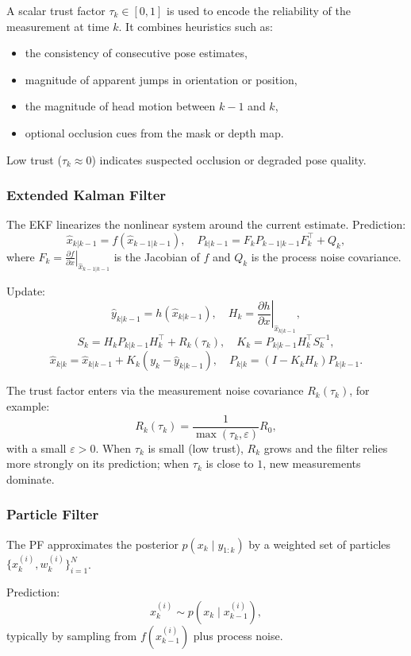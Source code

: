 A scalar trust factor $\tau_k \in [0,1]$ is used to encode the reliability of the measurement at time $k$. It combines heuristics such as:
\begin{itemize}
    \item the consistency of consecutive pose estimates,
    \item magnitude of apparent jumps in orientation or position,
    \item the magnitude of head motion between $k-1$ and $k$,
    \item optional occlusion cues from the mask or depth map.
\end{itemize}
Low trust ($\tau_k \approx 0$) indicates suspected occlusion or degraded pose quality.

\subsubsection*{Extended Kalman Filter}

The EKF linearizes the nonlinear system around the current estimate. Prediction:
\[
\hat{x}_{k|k-1} = f(\hat{x}_{k-1|k-1}), \quad
P_{k|k-1} = F_k P_{k-1|k-1} F_k^\top + Q_k,
\]
where $F_k = \left.\frac{\partial f}{\partial x}\right|_{\hat{x}_{k-1|k-1}}$ is the Jacobian of $f$ and $Q_k$ is the process noise covariance.

Update:
\[
\hat{y}_{k|k-1} = h(\hat{x}_{k|k-1}), \quad
H_k = \left.\frac{\partial h}{\partial x}\right|_{\hat{x}_{k|k-1}},
\]
\[
S_k = H_k P_{k|k-1} H_k^\top + R_k(\tau_k),
\quad
K_k = P_{k|k-1} H_k^\top S_k^{-1},
\]
\[
\hat{x}_{k|k} = \hat{x}_{k|k-1} + K_k (y_k - \hat{y}_{k|k-1}), \quad
P_{k|k} = (I - K_k H_k) P_{k|k-1}.
\]

The trust factor enters via the measurement noise covariance $R_k(\tau_k)$, for example:
\[
R_k(\tau_k) = \frac{1}{\max(\tau_k,\varepsilon)} R_0,
\]
with a small $\varepsilon > 0$. When $\tau_k$ is small (low trust), $R_k$ grows and the filter relies more strongly on its prediction; when $\tau_k$ is close to $1$, new measurements dominate.

\subsubsection*{Particle Filter}

The PF approximates the posterior $p(x_k \mid y_{1:k})$ by a weighted set of particles $\{x_k^{(i)}, w_k^{(i)}\}_{i=1}^N$.

Prediction:
\[
x_k^{(i)} \sim p(x_k \mid x_{k-1}^{(i)}),
\]
typically by sampling from $f(x_{k-1}^{(i)})$ plus process noise.

